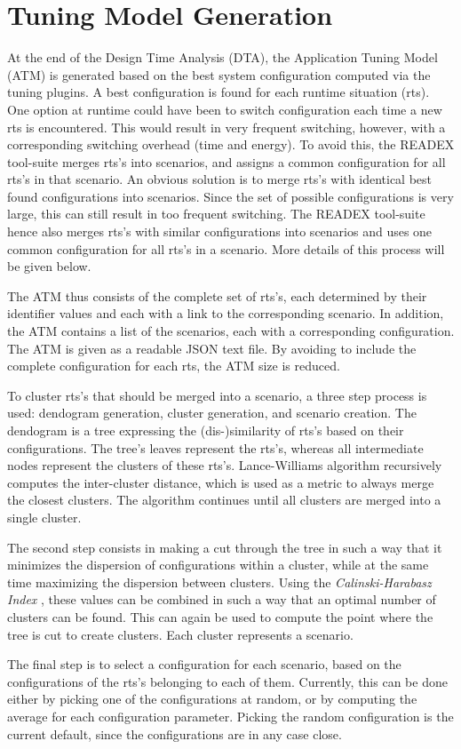\section{Tuning Model Generation} \label{tm-generation}

At the end of the Design Time Analysis (DTA), the Application Tuning Model (ATM) 
is generated based on the best system configuration computed via the tuning 
plugins. A best configuration is found for each runtime situation (rts). One 
option at runtime could have been to switch configuration each time a new rts is 
encountered. This would result in very frequent switching, however, with a 
corresponding switching overhead (time and energy). To avoid this, the READEX 
tool-suite merges rts's into scenarios, and assigns a common configuration for 
all rts's in that scenario. An obvious solution is to merge rts's with identical 
best found configurations into scenarios. Since the set of possible 
configurations is very large, this can still result in too frequent switching. 
The READEX tool-suite hence also merges rts's with similar configurations into 
scenarios and uses one common configuration for all rts's in a scenario. More 
details of this process will be given below.

The ATM thus consists of the complete set of rts's, each determined by their 
identifier values and each with a link to the corresponding scenario. In 
addition, the ATM contains a list of the scenarios, each with a corresponding 
configuration. The ATM is given as a readable JSON text file. By avoiding to 
include the complete configuration for each rts, the ATM size is reduced. 

To cluster rts's that should be merged into a scenario, a three step process is 
used: dendogram generation, cluster generation, and scenario creation. The 
dendogram is a tree expressing the (dis-)similarity of rts's based on their 
configurations. The tree's leaves represent the rts's, whereas all intermediate 
nodes represent the clusters of these rts's.  Lance-Williams algorithm 
\cite{Lance1967} recursively computes the inter-cluster distance, which is used 
as a metric to always merge the closest clusters. The algorithm continues until 
all clusters are merged into a single cluster. 

The second step consists in making a cut through the tree in such a way that it 
minimizes the dispersion of configurations within a cluster, while at the same 
time maximizing the dispersion between clusters. Using the 
\emph{Calinski-Harabasz Index} \cite{Calinski1974}, these values can be combined 
in such a way that an optimal number of clusters can be found. This can again be 
used to compute the point where the tree is cut to create clusters. Each cluster 
represents a scenario.

The final step is to select a configuration for each scenario, based on the 
configurations of the rts's belonging to each of them. Currently, this can be 
done either by picking one of the configurations at random, or by computing the 
average for each configuration parameter. Picking the random configuration is 
the current default, since the configurations are in any case close.


